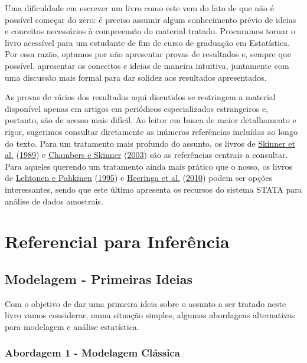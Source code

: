 \documentclass[
  12pt,
  brazilian,
]{book}
\theoremstyle{definition}
\theoremstyle{definition}
\theoremstyle{definition}
\theoremstyle{definition}
\theoremstyle{remark}
\begin{document}
Uma dificuldade em escrever um livro como este vem do fato de que não é possível começar do zero: é preciso assumir algum conhecimento prévio de ideias e conceitos necessários à compreensão do material tratado. Procuramos tornar o livro acessível para um estudante de fim de curso de graduação em Estatística. Por essa razão, optamos por não apresentar provas de resultados e, sempre que possível, apresentar os conceitos e ideias de maneira intuitiva, juntamente com uma discussão mais formal para dar solidez aos resultados apresentados.

As provas de vários dos resultados aqui discutidos se restringem a material disponível apenas em artigos em periódicos especializados estrangeiros e, portanto, são de acesso mais difícil. Ao leitor em busca de maior detalhamento e rigor, sugerimos consultar diretamente as inúmeras referências incluídas ao longo do texto. Para um tratamento mais profundo do assunto, os livros de \protect\hyperlink{ref-SHS89}{Skinner et al.} (\protect\hyperlink{ref-SHS89}{1989}) e \protect\hyperlink{ref-CHSK2003}{Chambers e Skinner} (\protect\hyperlink{ref-CHSK2003}{2003}) são as referências centrais a consultar. Para aqueles querendo um tratamento ainda mais prático que o nosso, os livros de \protect\hyperlink{ref-lethonen}{Lehtonen e Pahkinen} (\protect\hyperlink{ref-lethonen}{1995}) e \protect\hyperlink{ref-heeringa}{Heeringa et al.} (\protect\hyperlink{ref-heeringa}{2010}) podem ser opções interessantes, sendo que este último apresenta os recursos do sistema STATA para análise de dados amostrais.

\hypertarget{refinf}{%
\chapter{Referencial para Inferência}\label{refinf}}

\hypertarget{classic}{%
\section{Modelagem - Primeiras Ideias}\label{classic}}

Com o objetivo de dar uma primeira ideia sobre o assunto a ser tratado neste
livro vamos considerar, numa situação simples, algumas abordagens alternativas
para modelagem e análise estatística.

\hypertarget{abordagem-1---modelagem-cluxe1ssica}{%
\subsection{Abordagem 1 - Modelagem Clássica}\label{abordagem-1---modelagem-cluxe1ssica}}
\end{document}
